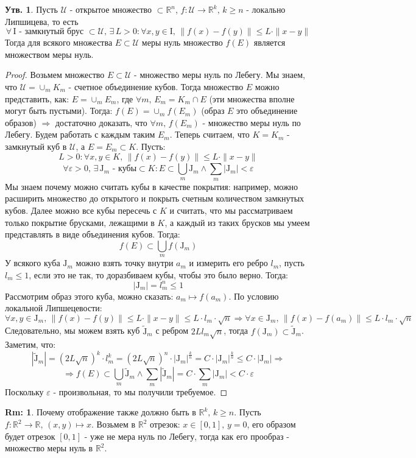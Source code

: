 \documentclass[12pt]{article}
\newcommand{\MR}{\mathbb{R}}
\newcommand{\MI}{\mathrm{I}}
\newcommand{\MJ}{\mathrm{J}}
\newcommand{\MU}{\mathcal{U}}
\newcommand{\VE}{\varepsilon}
\theoremstyle{definition}
\newtheorem{rem}{Rm:}
\newtheorem{prop}{Утв.}
\newcommand{\ddsum}[2]{\displaystyle\sum\limits_{#1}^{#2}}
\newcommand{\wte}[1]{\widetilde{#1}}
\begin{document}
\begin{prop}
	Пусть $\MU$ - открытое множество $\subset \MR^n$, $f\colon \MU \to \MR^k, \, k \geq n$ - локально Липшицева, то есть 
	$$
		\forall\,  \MI \text{ - замкнутый брус } \subset \MU, \, \exists \, L > 0 \colon \forall x,y \in \MI, \, \|f(x) - f(y)\| \leq L{\cdot}\|x -y \|
	$$
	Тогда для всякого множества $E \subset \MU$ меры нуль множество $f(E)$ является множеством меры нуль.
\end{prop}
\begin{proof}
	Возьмем множество $E \subset \MU$ - множество меры нуль по Лебегу. Мы знаем, что $\MU = \cup_m K_m$ - счетное объединение кубов. Тогда множество $E$ можно представить, как: $E = \cup_m E_m$, где $\forall m, \, E_m = K_m \cap E$ (эти множества вполне могут быть пустыми). Тогда: $f(E) = \cup_m f(E_m)$ (образ $E$ это объединение образов) $\Rightarrow$ достаточно доказать, что $\forall m, \, f(E_m)$ - множество меры нуль по Лебегу. Будем работать с каждым таким $E_m$. Теперь считаем, что $K = K_m$ - замкнутый куб в $\MU$, а $E = E_m\subset K$. Пусть:
	$$
		L > 0 \colon \forall x,y \in K, \, \|f(x) - f(y)\| \leq L{\cdot}\|x - y\|
	$$
	$$
		\forall \VE > 0, \, \exists \, \MJ_m \text{ - кубы} \subset K \colon E \subset \bigcup\limits_m \MJ_m \wedge \ddsum{m}{}|\MJ_m|< \VE
	$$
	Мы знаем почему можно считать кубы в качестве покрытия: например, можно расширить множество до открытого и покрыть счетным количеством замкнутых кубов. Далее можно все кубы пересечь с $K$ и считать, что мы рассматриваем только покрытие брусками, лежащими в $K$, а каждый из таких брусков мы умеем представлять в виде объединения кубов. Тогда:
	$$
		f(E) \subset \bigcup\limits_m f(\MJ_m)
	$$
	У всякого куба $\MJ_m$ можно взять точку внутри $a_m$ и измерить его ребро $l_m$, пусть $l_m \leq 1$, если это не так, то доразбиваем кубы, чтобы это было верно. Тогда: 
	$$
		|\MJ_m| = l_m^n \leq 1
	$$
	Рассмотрим образ этого куба, можно сказать: $a_m \mapsto f(a_m)$. По условию локальной Липшецевости:
	$$
		\forall x,y \in \MJ_m, \, \|f(x) - f(y)\| \leq L{\cdot}\|x - y\| \leq L{\cdot}l_m{\cdot}\sqrt{n} \Rightarrow \forall x \in \MJ_m, \, \|f(x) - f(a_m)\| \leq L{\cdot}l_m{\cdot}\sqrt{n}
	$$
	Следовательно, мы можем взять куб $\wte{\MJ}_m$ с ребром $2Ll_m\sqrt{n}$, тогда $f(\MJ_m) \subset \wte{\MJ}_m$. Заметим, что:
	$$
		|\wte{\MJ}_m| = \left(2 L \sqrt{n}\right)^k{\cdot}l_m^k = \left(2 L \sqrt{n}\right)^n{\cdot}|\MJ_m|^{\frac{k}{n}} = C{\cdot}|\MJ_m|^{\frac{k}{n}} \leq C{\cdot}|\MJ_m| \Rightarrow 
	$$
	$$
		\Rightarrow f(E) \subset \bigcup\limits_m \wte{\MJ}_m \wedge \ddsum{m}{}|\wte{\MJ}_m| = C{\cdot}\ddsum{m}{}|\MJ_m| < C{\cdot}\VE
	$$
	Поскольку $\VE$ - произвольная, то мы получили требуемое.
\end{proof}
\begin{rem}
	Почему отображение также должно быть в $\MR^k, \, k \geq n$. Пусть $f \colon \MR^2 \to \MR, \, (x,y) \mapsto x$. Возьмем в $\MR^2$ отрезок: $x \in [0,1],\, y =0$, его образом будет отрезок $[0,1]$ - уже не мера нуль по Лебегу, тогда как его прообраз - множество меры нуль в $\MR^2$.
\end{rem}
\end{document}
